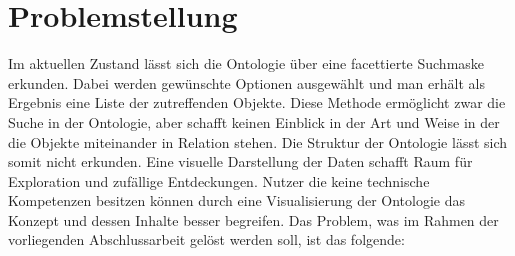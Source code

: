 \section{Problemstellung}\label{sec:problemstellung}


Im aktuellen Zustand lässt sich die Ontologie über eine facettierte Suchmaske erkunden. 
Dabei werden gewünschte Optionen ausgewählt und man erhält als Ergebnis eine Liste der zutreffenden Objekte.
Diese Methode ermöglicht zwar die Suche in der Ontologie, aber schafft keinen Einblick in der Art und Weise in der die Objekte miteinander in Relation stehen.
Die Struktur der Ontologie lässt sich somit nicht erkunden.
Eine visuelle Darstellung der Daten schafft Raum für Exploration und zufällige Entdeckungen. 
Nutzer die keine technische Kompetenzen besitzen können durch eine Visualisierung der Ontologie das Konzept und dessen Inhalte besser begreifen. \citep[vgl.]{linkeddatavisualization} \newline
\newline
Das Problem, was im Rahmen der vorliegenden Abschlussarbeit gelöst werden soll, ist das folgende:

